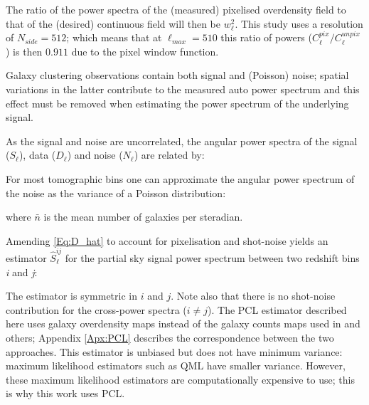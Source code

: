 \noindent The ratio of the power spectra of the (measured) pixelised overdensity field to that of the (desired) continuous field will then be $w_{\ell}^2$. This study uses a \healpix resolution of $N_{side} = 512$; which means that at $\ell_{max} = 510$ this ratio of powers ($C_{\ell}^{pix}/C_{\ell}^{unpix}$) is then $0.911$ due to the pixel window function.

\qquad Galaxy clustering observations contain both signal and (Poisson) noise; spatial variations in the latter contribute to the measured auto power spectrum and this effect must be removed when estimating the power spectrum of the underlying signal. 

\qquad As the signal and noise are uncorrelated, the angular power spectra of the signal ($S_{\ell}$), data ($D_{\ell}$) and noise ($N_{\ell}$) are related by:


\qquad For most tomographic bins one can approximate the angular power spectrum of the noise as the variance of a Poisson distribution:


\noindent where $\bar{n}$ is the mean number of galaxies per steradian.

\qquad Amending \eqref{Eq:D_hat} to account for pixelisation and shot-noise yields an estimator $\hat{S}^{ij}_{\ell}$ for the partial sky signal power spectrum between two redshift bins \textit{i} and \textit{j}:



\noindent The estimator is symmetric in $i$ and $j$. Note also that there is no shot-noise contribution for the cross-power spectra ($i \neq j$). The PCL estimator described here uses galaxy overdensity maps instead of the galaxy counts maps used in \cite{Blake2007,Thomas2011} and others; Appendix \ref{Apx:PCL} describes the correspondence between the two approaches. This estimator is unbiased \citep{Peebles1973} but does not have minimum variance: maximum likelihood estimators such as QML \citep[e.g.][]{Efstat2004} have smaller variance. However, these maximum likelihood estimators are computationally expensive to use; this is why this work uses PCL. %

